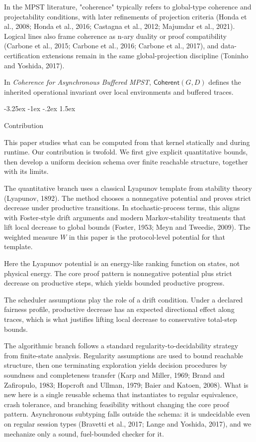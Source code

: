 \documentclass[a4paper,10pt,twocolumn,english]{article}
\makeatletter
\renewcommand{\subsection}{\@startsection{subsection}{2}{\z@}%
  {-3.25ex \@plus -1ex \@minus -.2ex}%
  {1.5ex}%
  {\raggedright\normalfont\normalsize\bfseries}}
\numberwithin{equation}{section}
\theoremstyle{paperdef}
\theoremstyle{paperplain}
\theoremstyle{paperdef}
\theoremstyle{paperremark}
\newcommand{\Coherent}{\ensuremath{\mathsf{Coherent}}}
\makeatother
\begin{document}
In the MPST literature, "coherence" typically refers to global-type coherence and projectability conditions,
with later refinements of projection criteria (Honda et al., 2008; Honda et al., 2016; Castagna et al.,
2012; Majumdar et al., 2021). Logical lines also frame coherence as n-ary duality or proof compatibility
(Carbone et al., 2015; Carbone et al., 2016; Carbone et al., 2017), and data-certification extensions
remain in the same global-projection discipline (Toninho and
Yoshida, 2017).

In \emph{Coherence for Asynchronous Buffered MPST}, $\Coherent(G,D)$ defines the inherited operational
invariant over local environments and buffered traces.

\subsection{Contribution}

This paper studies what can be computed from that kernel statically and during runtime. Our contribution is twofold. We first give explicit quantitative bounds, then develop a uniform
decision schema over finite reachable structure, together with its limits.

The quantitative branch uses a classical Lyapunov template from stability theory (Lyapunov, 1892).
The method chooses a nonnegative potential and proves strict decrease under productive transitions.
In stochastic-process terms, this aligns with Foster-style drift arguments and modern Markov-stability
treatments that lift local decrease to global bounds (Foster, 1953; Meyn and Tweedie, 2009). The
weighted measure $W$ in this paper is the protocol-level potential for that template.

Here the Lyapunov potential is an energy-like ranking function on states, not physical energy. The
core proof pattern is nonnegative potential plus strict decrease on productive steps, which yields
bounded productive progress.

The scheduler assumptions play the role of a drift condition. Under a declared fairness profile,
productive decrease has an expected directional effect along traces, which is what justifies
lifting local decrease to conservative total-step bounds.

The algorithmic branch follows a standard regularity-to-decidability strategy from finite-state
analysis. Regularity assumptions are used to bound reachable structure, then one terminating
exploration yields decision procedures by soundness and completeness transfer (Karp and Miller,
1969; Brand and Zafiropulo, 1983; Hopcroft and Ullman, 1979; Baier and Katoen, 2008). What is new
here is a single reusable schema that instantiates to regular equivalence, crash tolerance, and
branching feasibility without changing the core proof pattern. Asynchronous subtyping falls outside
the schema: it is undecidable even on regular session types (Bravetti et al., 2017; Lange and
Yoshida, 2017), and we mechanize only a sound, fuel-bounded checker for it.
\end{document}
